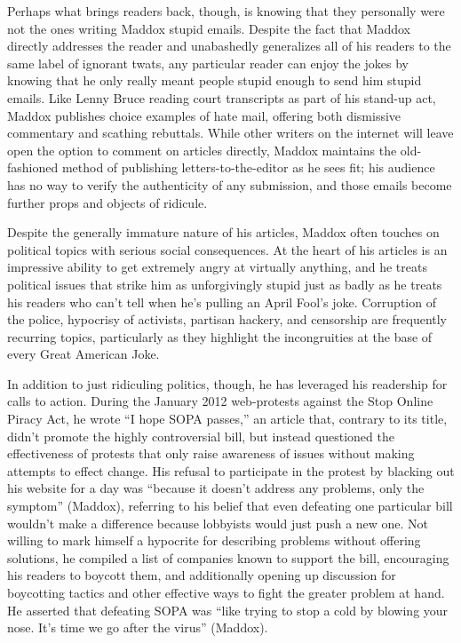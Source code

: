 Perhaps what brings readers back, though, is knowing that they personally were
not the ones writing Maddox stupid emails. Despite the fact that Maddox directly
addresses the reader and unabashedly generalizes all of his readers to the same
label of ignorant twats, any particular reader can enjoy the jokes by knowing
that he only really meant people stupid enough to send him stupid emails. Like
Lenny Bruce reading court transcripts as part of his stand-up act, Maddox
publishes choice examples of hate mail, offering both dismissive commentary and
scathing rebuttals. While other writers on the internet will leave open the
option to comment on articles directly, Maddox maintains the old-fashioned
method of publishing letters-to-the-editor as he sees fit; his audience has no
way to verify the authenticity of any submission, and those emails become
further props and objects of ridicule.

Despite the generally immature nature of his articles, Maddox often touches on
political topics with serious social consequences. At the heart of his articles
is an impressive ability to get extremely angry at virtually anything, and he
treats political issues that strike him as unforgivingly stupid just as badly as
he treats his readers who can't tell when he's pulling an April Fool's joke.
Corruption of the police, hypocrisy of activists, partisan hackery, and
censorship are frequently recurring topics, particularly as they highlight the
incongruities at the base of every Great American Joke.

In addition to just ridiculing politics, though, he has leveraged his readership
for calls to action. During the January 2012 web-protests against the Stop
Online Piracy Act, he wrote ``I hope SOPA passes,'' an article that, contrary to
its title, didn't promote the highly controversial bill, but instead questioned
the effectiveness of protests that only raise awareness of issues without making
attempts to effect change. His refusal to participate in the protest by blacking
out his website for a day was ``because it doesn't address any problems, only
the symptom'' (Maddox), referring to his belief that even defeating one
particular bill wouldn't make a difference because lobbyists would just push a
new one. Not willing to mark himself a hypocrite for describing problems without
offering solutions, he compiled a list of companies known to support the bill,
encouraging his readers to boycott them, and additionally opening up discussion
for boycotting tactics and other effective ways to fight the greater problem at
hand. He asserted that defeating SOPA was ``like trying to stop a cold by
blowing your nose. It's time we go after the virus'' (Maddox).

